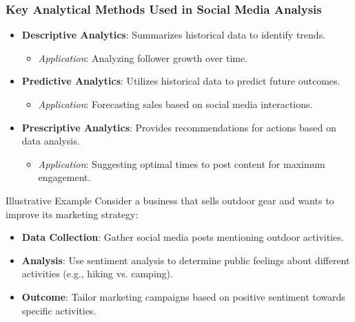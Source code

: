 \documentclass{beamer}
\begin{document}
\begin{frame}[fragile]
    \frametitle{Key Analytical Methods Used in Social Media Analysis}
    \begin{itemize}
        \item \textbf{Descriptive Analytics}: Summarizes historical data to identify trends.
            \begin{itemize}
                \item \textit{Application}: Analyzing follower growth over time.
            \end{itemize}
        
        \item \textbf{Predictive Analytics}: Utilizes historical data to predict future outcomes.
            \begin{itemize}
                \item \textit{Application}: Forecasting sales based on social media interactions.
            \end{itemize}
        
        \item \textbf{Prescriptive Analytics}: Provides recommendations for actions based on data analysis.
            \begin{itemize}
                \item \textit{Application}: Suggesting optimal times to post content for maximum engagement.
            \end{itemize}
    \end{itemize}

    \begin{block}{Illustrative Example}
        Consider a business that sells outdoor gear and wants to improve its marketing strategy:
        \begin{itemize}
            \item \textbf{Data Collection}: Gather social media posts mentioning outdoor activities.
            \item \textbf{Analysis}: Use sentiment analysis to determine public feelings about different activities (e.g., hiking vs. camping).
            \item \textbf{Outcome}: Tailor marketing campaigns based on positive sentiment towards specific activities.
        \end{itemize}
    \end{block}
\end{frame}
\end{document}
